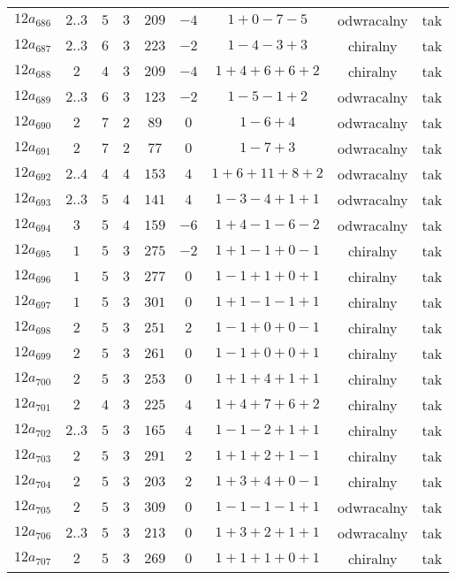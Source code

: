 \begin{longtable}{ccccccccc}
$12a_{686}$ & $2..3$ & $5$ & $3$ & $209$ & $-4$ & $1+0-7-5$ & odwracalny & tak \\
$12a_{687}$ & $2..3$ & $6$ & $3$ & $223$ & $-2$ & $1-4-3+3$ & chiralny & tak \\
$12a_{688}$ & $2$ & $4$ & $3$ & $209$ & $-4$ & $1+4+6+6+2$ & chiralny & tak \\
$12a_{689}$ & $2..3$ & $6$ & $3$ & $123$ & $-2$ & $1-5-1+2$ & odwracalny & tak \\
$12a_{690}$ & $2$ & $7$ & $2$ & $89$ & $0$ & $1-6+4$ & odwracalny & tak \\
$12a_{691}$ & $2$ & $7$ & $2$ & $77$ & $0$ & $1-7+3$ & odwracalny & tak \\
$12a_{692}$ & $2..4$ & $4$ & $4$ & $153$ & $4$ & $1+6+11+8+2$ & odwracalny & tak \\
$12a_{693}$ & $2..3$ & $5$ & $4$ & $141$ & $4$ & $1-3-4+1+1$ & odwracalny & tak \\
$12a_{694}$ & $3$ & $5$ & $4$ & $159$ & $-6$ & $1+4-1-6-2$ & odwracalny & tak \\
$12a_{695}$ & $1$ & $5$ & $3$ & $275$ & $-2$ & $1+1-1+0-1$ & chiralny & tak \\
$12a_{696}$ & $1$ & $5$ & $3$ & $277$ & $0$ & $1-1+1+0+1$ & chiralny & tak \\
$12a_{697}$ & $1$ & $5$ & $3$ & $301$ & $0$ & $1+1-1-1+1$ & chiralny & tak \\
$12a_{698}$ & $2$ & $5$ & $3$ & $251$ & $2$ & $1-1+0+0-1$ & chiralny & tak \\
$12a_{699}$ & $2$ & $5$ & $3$ & $261$ & $0$ & $1-1+0+0+1$ & chiralny & tak \\
$12a_{700}$ & $2$ & $5$ & $3$ & $253$ & $0$ & $1+1+4+1+1$ & chiralny & tak \\
$12a_{701}$ & $2$ & $4$ & $3$ & $225$ & $4$ & $1+4+7+6+2$ & chiralny & tak \\
$12a_{702}$ & $2..3$ & $5$ & $3$ & $165$ & $4$ & $1-1-2+1+1$ & chiralny & tak \\
$12a_{703}$ & $2$ & $5$ & $3$ & $291$ & $2$ & $1+1+2+1-1$ & chiralny & tak \\
$12a_{704}$ & $2$ & $5$ & $3$ & $203$ & $2$ & $1+3+4+0-1$ & chiralny & tak \\
$12a_{705}$ & $2$ & $5$ & $3$ & $309$ & $0$ & $1-1-1-1+1$ & odwracalny & tak \\
$12a_{706}$ & $2..3$ & $5$ & $3$ & $213$ & $0$ & $1+3+2+1+1$ & odwracalny & tak \\
$12a_{707}$ & $2$ & $5$ & $3$ & $269$ & $0$ & $1+1+1+0+1$ & chiralny & tak \\

\end{longtable}
